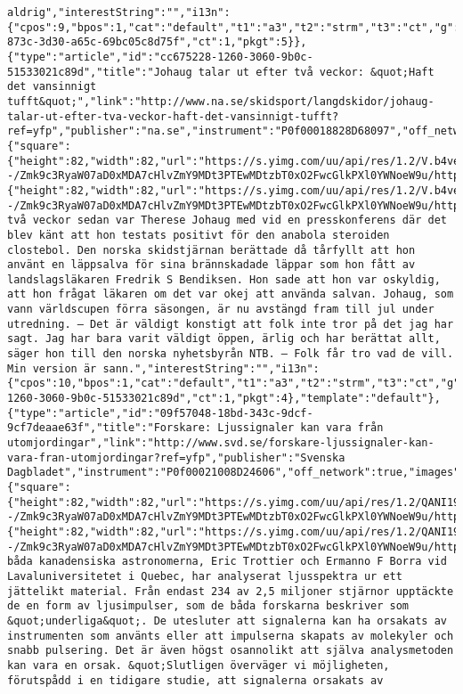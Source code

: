 \begin{verbatim}
aldrig","interestString":"","i13n":{"cpos":9,"bpos":1,"cat":"default","t1":"a3","t2":"strm","t3":"ct","g":"a4dd5d99-873c-3d30-a65c-69bc05c8d75f","ct":1,"pkgt":5}},{"type":"article","id":"cc675228-1260-3060-9b0c-51533021c89d","title":"Johaug talar ut efter två veckor: &quot;Haft det vansinnigt tufft&quot;","link":"http://www.na.se/skidsport/langdskidor/johaug-talar-ut-efter-tva-veckor-haft-det-vansinnigt-tufft?ref=yfp","publisher":"na.se","instrument":"P0f00018828D68097","off_network":true,"images":{"square":{"height":82,"width":82,"url":"https://s.yimg.com/uu/api/res/1.2/V.b4ve3BGD8EZFbNotHdxQ--/Zmk9c3RyaW07aD0xMDA7cHlvZmY9MDt3PTEwMDtzbT0xO2FwcGlkPXl0YWNoeW9u/http://slingstone.zenfs.com/offnetwork/0b8db06b0e3381255056dd31a1861de5","defer":1}},"image":{"height":82,"width":82,"url":"https://s.yimg.com/uu/api/res/1.2/V.b4ve3BGD8EZFbNotHdxQ--/Zmk9c3RyaW07aD0xMDA7cHlvZmY9MDt3PTEwMDtzbT0xO2FwcGlkPXl0YWNoeW9u/http://slingstone.zenfs.com/offnetwork/0b8db06b0e3381255056dd31a1861de5","defer":1},"summary":"För två veckor sedan var Therese Johaug med vid en presskonferens där det blev känt att hon testats positivt för den anabola steroiden clostebol. Den norska skidstjärnan berättade då tårfyllt att hon använt en läppsalva för sina brännskadade läppar som hon fått av landslagsläkaren Fredrik S Bendiksen. Hon sade att hon var oskyldig, att hon frågat läkaren om det var okej att använda salvan. Johaug, som vann världscupen förra säsongen, är nu avstängd fram till jul under utredning. – Det är väldigt konstigt att folk inte tror på det jag har sagt. Jag har bara varit väldigt öppen, ärlig och har berättat allt, säger hon till den norska nyhetsbyrån NTB. – Folk får tro vad de vill. Min version är sann.","interestString":"","i13n":{"cpos":10,"bpos":1,"cat":"default","t1":"a3","t2":"strm","t3":"ct","g":"cc675228-1260-3060-9b0c-51533021c89d","ct":1,"pkgt":4},"template":"default"},{"type":"article","id":"09f57048-18bd-343c-9dcf-9cf7deaae63f","title":"Forskare: Ljussignaler kan vara från utomjordingar","link":"http://www.svd.se/forskare-ljussignaler-kan-vara-fran-utomjordingar?ref=yfp","publisher":"Svenska Dagbladet","instrument":"P0f00021008D24606","off_network":true,"images":{"square":{"height":82,"width":82,"url":"https://s.yimg.com/uu/api/res/1.2/QANI19.NLXOJ33b.KL_k1w--/Zmk9c3RyaW07aD0xMDA7cHlvZmY9MDt3PTEwMDtzbT0xO2FwcGlkPXl0YWNoeW9u/http://slingstone.zenfs.com/offnetwork/23dec6f48aa567458baeb93daff91e92","defer":1}},"image":{"height":82,"width":82,"url":"https://s.yimg.com/uu/api/res/1.2/QANI19.NLXOJ33b.KL_k1w--/Zmk9c3RyaW07aD0xMDA7cHlvZmY9MDt3PTEwMDtzbT0xO2FwcGlkPXl0YWNoeW9u/http://slingstone.zenfs.com/offnetwork/23dec6f48aa567458baeb93daff91e92","defer":1},"summary":"De båda kanadensiska astronomerna, Eric Trottier och Ermanno F Borra vid Lavaluniversitetet i Quebec, har analyserat ljusspektra ur ett jättelikt material. Från endast 234 av 2,5 miljoner stjärnor upptäckte de en form av ljusimpulser, som de båda forskarna beskriver som &quot;underliga&quot;. De utesluter att signalerna kan ha orsakats av instrumenten som använts eller att impulserna skapats av molekyler och snabb pulsering. Det är även högst osannolikt att själva analysmetoden kan vara en orsak. &quot;Slutligen överväger vi möjligheten, förutspådd i en tidigare studie, att signalerna orsakats av 
\end{verbatim}
